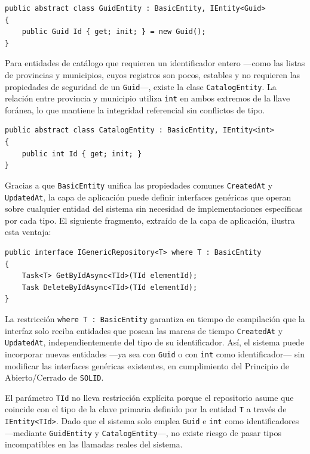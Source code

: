 \begin{lstlisting}[language={[Sharp]C}, caption={Clase GuidEntity para entidades con identificador Guid}, label={lst:guidentity}]
public abstract class GuidEntity : BasicEntity, IEntity<Guid>
{
    public Guid Id { get; init; } = new Guid();
}
\end{lstlisting}

Para entidades de catálogo que requieren un identificador entero —como las listas de provincias y municipios, cuyos registros son pocos, estables y no requieren las propiedades de seguridad de un \texttt{Guid}—, existe la clase \texttt{CatalogEntity}.
La relación entre provincia y municipio utiliza \texttt{int} en ambos extremos de la llave foránea, lo que mantiene la integridad referencial sin conflictos de tipo.

\begin{lstlisting}[language={[Sharp]C}, caption={Clase CatalogEntity para entidades con identificador entero}, label={lst:catalogentity}]
public abstract class CatalogEntity : BasicEntity, IEntity<int>
{
    public int Id { get; init; }
}
\end{lstlisting}

Gracias a que \texttt{BasicEntity} unifica las propiedades comunes \texttt{CreatedAt} y \texttt{UpdatedAt}, la capa de aplicación puede definir interfaces genéricas que operan sobre cualquier entidad del sistema sin necesidad de implementaciones específicas por cada tipo. 
El siguiente fragmento, extraído de la capa de aplicación, ilustra esta ventaja:

\begin{lstlisting}[language={[Sharp]C}, caption={Interfaz genérica que opera sobre cualquier entidad que herede de BasicEntity}, label={lst:genericinterface}]
public interface IGenericRepository<T> where T : BasicEntity
{
    Task<T> GetByIdAsync<TId>(TId elementId);
    Task DeleteByIdAsync<TId>(TId elementId);
}
\end{lstlisting}

La restricción \texttt{where T : BasicEntity} garantiza en tiempo de compilación que la interfaz solo reciba entidades que posean las marcas de tiempo \texttt{CreatedAt} y \texttt{UpdatedAt}, independientemente del tipo de su identificador. Así, el sistema puede incorporar nuevas entidades —ya sea con \texttt{Guid} o con \texttt{int} como identificador— sin modificar las interfaces genéricas existentes, en cumplimiento del Principio de Abierto/Cerrado de \texttt{SOLID}.

El parámetro \texttt{TId} no lleva restricción explícita porque el repositorio asume que coincide con el tipo de la clave primaria definido por la entidad \texttt{T} a través de \texttt{IEntity<TId>}. Dado que el sistema solo emplea \texttt{Guid} e \texttt{int} como identificadores —mediante \texttt{GuidEntity} y \texttt{CatalogEntity}—, no existe riesgo de pasar tipos incompatibles en las llamadas reales del sistema.

